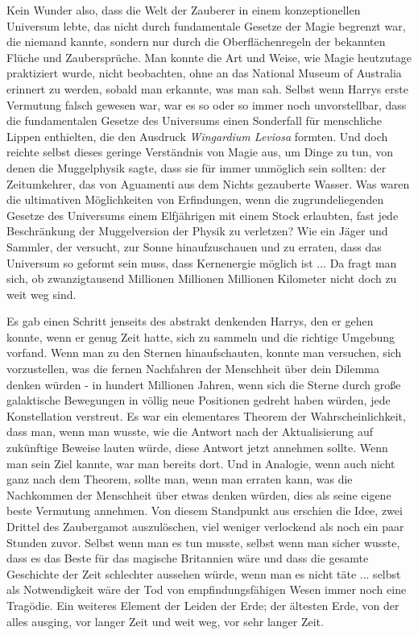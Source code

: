 Kein Wunder also, dass die Welt der Zauberer in einem konzeptionellen Universum
lebte, das nicht durch fundamentale Gesetze der Magie begrenzt war, die niemand
kannte, sondern nur durch die Oberflächenregeln der bekannten Flüche und
Zaubersprüche. Man konnte die Art und Weise, wie Magie heutzutage praktiziert
wurde, nicht beobachten, ohne an das National Museum of Australia erinnert zu
werden, sobald man erkannte, was man sah. Selbst wenn Harrys erste Vermutung
falsch gewesen war, war es so oder so immer noch unvorstellbar, dass die
fundamentalen Gesetze des Universums einen Sonderfall für menschliche Lippen
enthielten, die den Ausdruck \emph{\glqq{}Wingardium Leviosa\grqq{}} formten.
Und doch reichte selbst dieses geringe Verständnis von Magie aus, um Dinge zu
tun, von denen die Muggelphysik sagte, dass sie für immer unmöglich sein
sollten: der Zeitumkehrer, das von Aguamenti aus dem Nichts gezauberte Wasser.
Was waren die ultimativen Möglichkeiten von Erfindungen, wenn die
zugrundeliegenden Gesetze des Universums einem Elfjährigen mit einem Stock
erlaubten, fast jede Beschränkung der Muggelversion der Physik zu verletzen? Wie
ein Jäger und Sammler, der versucht, zur Sonne hinaufzuschauen und zu erraten,
dass das Universum so geformt sein muss, dass Kernenergie möglich ist ... Da
fragt man sich, ob zwanzigtausend Millionen Millionen Millionen Kilometer nicht
doch zu weit weg sind.

Es gab einen Schritt jenseits des abstrakt denkenden Harrys, den er gehen
konnte, wenn er genug Zeit hatte, sich zu sammeln und die richtige Umgebung
vorfand. Wenn man zu den Sternen hinaufschauten, konnte man versuchen, sich
vorzustellen, was die fernen Nachfahren der Menschheit über dein Dilemma denken
würden - in hundert Millionen Jahren, wenn sich die Sterne durch große
galaktische Bewegungen in völlig neue Positionen gedreht haben würden, jede
Konstellation verstreut. Es war ein elementares Theorem der Wahrscheinlichkeit,
dass man, wenn man wusste, wie die Antwort nach der Aktualisierung auf
zukünftige Beweise lauten würde, diese Antwort jetzt annehmen sollte. Wenn man
sein Ziel kannte, war man bereits dort. Und in Analogie, wenn auch nicht ganz
nach dem Theorem, sollte man, wenn man erraten kann, was die Nachkommen der
Menschheit über etwas denken würden, dies als seine eigene beste Vermutung
annehmen. Von diesem Standpunkt aus erschien die Idee, zwei Drittel des
Zaubergamot auszulöschen, viel weniger verlockend als noch ein paar Stunden
zuvor. Selbst wenn man es tun musste, selbst wenn man sicher wusste, dass es das
Beste für das magische Britannien wäre und dass die gesamte Geschichte der Zeit
schlechter aussehen würde, wenn man es nicht täte ... selbst als Notwendigkeit
wäre der Tod von empfindungsfähigen Wesen immer noch eine Tragödie. Ein weiteres
Element der Leiden der Erde; der ältesten Erde, von der alles ausging, vor
langer Zeit und weit weg, vor sehr langer Zeit.

